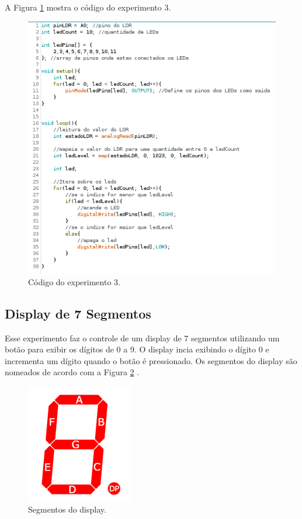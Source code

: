 \documentclass[12pt]{article}
\begin{document}
	A Figura \ref{codigoExp3} mostra o código do experimento 3.

	\begin{figure}[H]
		\centering
		\includegraphics[scale=0.39]{Imagens/Experimentos/3-LDR-LEDGraph/codigo.png}
		\caption{Código do experimento 3.}
		\label{codigoExp3}
	\end{figure}

\subsection{Display de 7 Segmentos}
	Esse experimento faz o controle de um display de 7 segmentos utilizando um botão para exibir os dígitos de 0 a 9. O display incia exibindo o dígito 0 e incrementa um dígito quando o botão é pressionado. Os segmentos do display são nomeados de acordo com a Figura \ref{figSegmentosDisplay} \cite{siteDisplay7}.

	\begin{figure}[H]
		\centering
		\includegraphics[scale=0.5]{Imagens/Experimentos/4-Display7Seg/7segmentos.png}
		\caption{Segmentos do display.}
		\label{figSegmentosDisplay}
	\end{figure}
\end{document}
